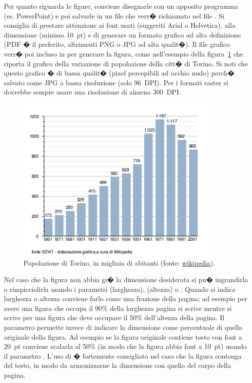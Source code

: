 Per quanto riguarda le figure, conviene disegnarle con un apposito programma (es. PowerPoint) e poi salvarle in un file che verr� richiamato nel file \ltx.
Si consiglia di prestare attenzione ai font usati (suggeriti Arial o Helvetica), alla dimensione (minimo \SI{10}{pt}) e di generare un formato grafico ad alta definizione (PDF � il preferito, altrimenti PNG o JPG ad alta qualit�).
Il file grafico verr� poi incluso in \ltx per generare la figura, come nell'esempio della figura~\ref{fig:popTorino} che riporta il grafico della variazione di popolazione della citt� di Torino.
Si noti che questo grafico � di bassa qualit� (pixel percepibili ad occhio nudo) perch� salvato come JPG a bassa risoluzione (solo \SI{96}{DPI}).
Per i formati raster si dovrebbe sempre usare una risoluzione di almeno \SI{300}{DPI}.
%
\begin{figure}[tbh]%
\centerline{\includegraphics[width=0.9\textwidth]{other/torino.png}}
\caption{Popolazione di Torino, in migliaia di abitanti (fonte: \href{http://it.wikipedia.org/wiki/Torino}{wikipedia}).\label{fig:popTorino}}
\end{figure}
%
Nel caso che la figura non abbia gi� la dimensione desiderata si pu� ingrandirla o rimpicciolirla usando i parametri  (larghezza),  (altezza) o .
Quando si indica larghezza o altezza conviene farlo come una frazione della pagina; ad esempio per avere una figura che occupa il 90\% della larghezza pagina si scrive  mentre si scrive  per una figura che deve occupare il 50\% dell'altezza della pagina.
Il parametro  permette invece di indicare la dimensione come percentuale di quella originale della figura.
Ad esempio se la figura originale contiene testo con font a \SI{20}{pt} conviene scalarla al 50\% (in modo che la figura abbia font a \SI{10}{pt}) usando il parametro . L'uso di  � fortemente consigliato nel caso che la figura contenga del testo, in modo da armonizzarne la dimensione con quello del corpo della pagina.

